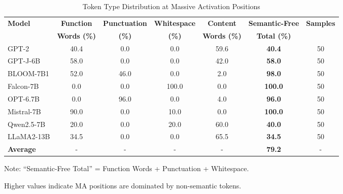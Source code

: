 
\begin{table}[htbp]
\centering
\caption{Token Type Distribution at Massive Activation Positions}
\label{tab:function_word_ratio}
\begin{tabular}{lcccccc}
\toprule
\textbf{Model} & \textbf{Function} & \textbf{Punctuation} & \textbf{Whitespace} & \textbf{Content} & \textbf{Semantic-Free} & \textbf{Samples} \\
 & \textbf{Words (\%)} & \textbf{(\%)} & \textbf{(\%)} & \textbf{Words (\%)} & \textbf{Total (\%)} & \\
\midrule
GPT-2 & 40.4 & 0.0 & 0.0 & 59.6 & \textbf{40.4} & 50 \\
GPT-J-6B & 58.0 & 0.0 & 0.0 & 42.0 & \textbf{58.0} & 50 \\
BLOOM-7B1 & 52.0 & 46.0 & 0.0 & 2.0 & \textbf{98.0} & 50 \\
Falcon-7B & 0.0 & 0.0 & 100.0 & 0.0 & \textbf{100.0} & 50 \\
OPT-6.7B & 0.0 & 96.0 & 0.0 & 4.0 & \textbf{96.0} & 50 \\
Mistral-7B & 90.0 & 0.0 & 10.0 & 0.0 & \textbf{100.0} & 50 \\
Qwen2.5-7B & 20.0 & 0.0 & 20.0 & 60.0 & \textbf{40.0} & 50 \\
LLaMA2-13B & 34.5 & 0.0 & 0.0 & 65.5 & \textbf{34.5} & 50 \\
\midrule
\textbf{Average} & - & - & - & - & \textbf{79.2} & - \\
\bottomrule
\end{tabular}
\begin{tablenotes}
\small
\item Note: ``Semantic-Free Total'' = Function Words + Punctuation + Whitespace. 
\item Higher values indicate MA positions are dominated by non-semantic tokens.
\end{tablenotes}
\end{table}
